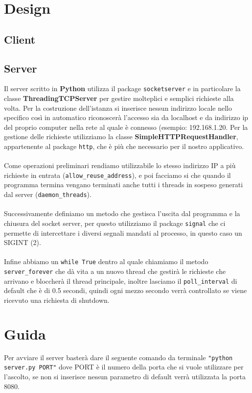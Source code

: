 \documentclass[a4paper,12pt]{report}
\begin{document}
\chapter{Design}

\section{Client}

\clearpage

\section{Server}
Il server scritto in \textbf{Python} utilizza il package \texttt{socketserver} e in particolare la classe \textbf{ThreadingTCPServer} per gestire molteplici e semplici richieste alla volta.
Per la costruzione dell’istanza si inserisce nessun indirizzo locale nello specifico così in automatico riconoscerà l’accesso sia da localhost e da indirizzo ip del proprio computer nella rete al quale è connesso (esempio: 192.168.1.20.
Per la gestione delle richieste utilizziamo la classe \textbf{SimpleHTTPRequestHandler}, appartenente al package \texttt{http}, che è più che necessario per il nostro applicativo.
\\
\\
Come operazioni preliminari rendiamo utilizzabile lo stesso indirizzo IP a più richieste in entrata (\texttt{allow\_reuse\_address}), e poi facciamo si che quando il programma termina vengano terminati anche tutti i threads in sospeso generati dal server (\texttt{daemon\_threads}).
\\
\\
Successivamente definiamo un metodo che gestisca l’uscita dal programma e la chiusura del socket server, per questo utilizziamo il package \texttt{signal} che ci permette di intercettare i diversi segnali mandati al processo, in questo caso un SIGINT (2).
\\
\\
Infine abbiamo un \texttt{while True} dentro al quale chiamiamo il metodo \texttt{server\_forever} che dà vita a un nuovo thread che gestirà le richieste che arrivano e bloccherà il thread principale, inoltre lasciamo il \texttt{poll\_interval} di default che è di 0.5 secondi, quindi ogni mezzo secondo verrà controllato se viene ricevuto una richiesta di shutdown.

\chapter{Guida}
Per avviare il server basterà dare il seguente comando da terminale \texttt{"python server.py PORT"} dove PORT è il numero della porta che si vuole utilizzare per l’ascolto, se non si inserisce nessun parametro di default verrà utilizzata la porta 8080.
\end{document}
